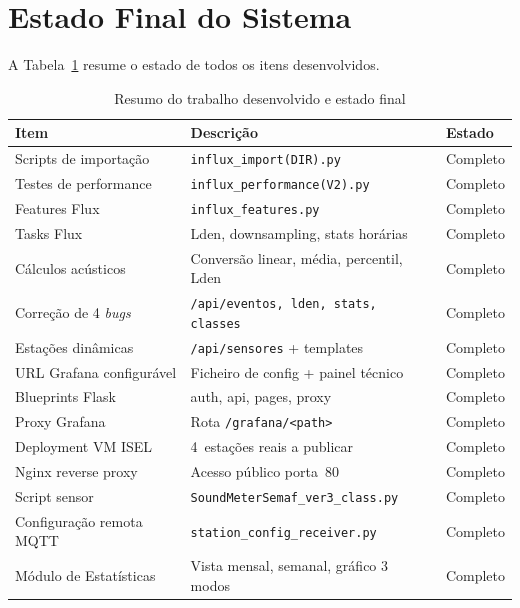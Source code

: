 \documentclass[12pt,a4paper]{report}
\begin{document}
\section{Estado Final do Sistema}

A Tabela~\ref{tab:estado} resume o estado de todos os itens desenvolvidos.

\begin{table}[H]
\centering\small
\caption{Resumo do trabalho desenvolvido e estado final}
\label{tab:estado}
\begin{tabular}{|p{4.5cm}|p{6cm}|l|}
\hline
\textbf{Item} & \textbf{Descrição} & \textbf{Estado} \\
\hline
Scripts de importação       & \texttt{influx\_import(DIR).py}            & Completo \\
\hline
Testes de performance       & \texttt{influx\_performance(V2).py}        & Completo \\
\hline
Features Flux               & \texttt{influx\_features.py}              & Completo \\
\hline
Tasks Flux                  & Lden, downsampling, stats horárias        & Completo \\
\hline
Cálculos acústicos          & Conversão linear, média, percentil, Lden  & Completo \\
\hline
Correção de 4 \textit{bugs} & \texttt{/api/eventos, lden, stats, classes} & Completo \\
\hline
Estações dinâmicas          & \texttt{/api/sensores} + templates        & Completo \\
\hline
URL Grafana configurável    & Ficheiro de config + painel técnico       & Completo \\
\hline
Blueprints Flask            & auth, api, pages, proxy                   & Completo \\
\hline
Proxy Grafana               & Rota \texttt{/grafana/<path>}             & Completo \\
\hline
Deployment VM ISEL          & 4~estações reais a publicar               & Completo \\
\hline
Nginx reverse proxy         & Acesso público porta~80                   & Completo \\
\hline
Script sensor               & \texttt{SoundMeterSemaf\_ver3\_class.py}  & Completo \\
\hline
Configuração remota MQTT    & \texttt{station\_config\_receiver.py}     & Completo \\
\hline
Módulo de Estatísticas      & Vista mensal, semanal, gráfico 3 modos    & Completo \\

\end{tabular}
\end{table}
\end{document}
